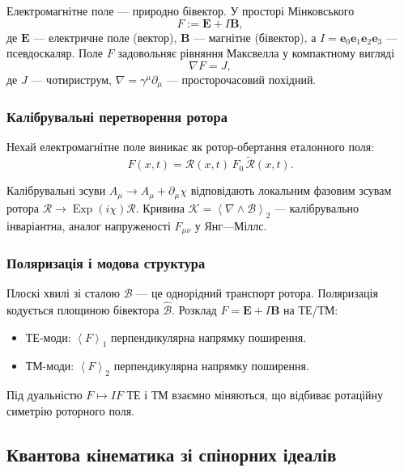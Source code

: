 \documentclass[11pt,a4paper]{article}
\newcommand{\e}{\mathbf{e}}
\newcommand{\grade}[2]{\left\langle #1 \right\rangle_{#2}}
\newcommand{\vecp}[1]{\grade{#1}{1}}
\newcommand{\biv}[1]{\grade{#1}{2}}
\newcommand{\rev}[1]{\widetilde{#1}}           %
\newcommand{\Exp}{\operatorname{Exp}}
\newcommand{\Rotor}{\mathcal{R}}
\newcommand{\Biv}{\mathcal{B}}
\newcommand{\D}{\nabla}                        %
\theoremstyle{definition}
\theoremstyle{plain}
\theoremstyle{remark}
\begin{document}
Електромагнітне поле — природно бівектор. У просторі Мінковського
\begin{equation}
F := \mathbf{E} + I\mathbf{B},
\end{equation}
де $\mathbf{E}$ — електричне поле (вектор), $\mathbf{B}$ — магнітне (бівектор), а $I = \e_0\e_1\e_2\e_3$ — псевдоскаляр. Поле $F$ задовольняє рівняння Максвелла у компактному вигляді
\begin{equation}
\D F = J,
\end{equation}
де $J$ — чотириструм, $\D = \gamma^\mu \partial_\mu$ — просторочасовий похідний.

\subsubsection{Калібрувальні перетворення ротора}

Нехай електромагнітне поле виникає як ротор-обертання еталонного поля:
\begin{equation}
F(x,t) = \Rotor(x,t)\, F_0\, \rev{\Rotor}(x,t).
\end{equation}

Калібрувальні зсуви $A_\mu \to A_\mu + \partial_\mu \chi$ відповідають локальним фазовим зсувам ротора $\Rotor \to \Exp(i\chi)\Rotor$. Кривина $\mathcal{K} = \biv{\D \wedge \Biv}$ — калібрувально інваріантна, аналог напруженості $F_{\mu\nu}$ у Янг—Міллс.

\subsubsection{Поляризація і модова структура}

Плоскі хвилі зі сталою $\Biv$ — це однорідний транспорт ротора. Поляризація кодується площиною бівектора $\hat{\Biv}$. Розклад $F = \mathbf{E} + I\mathbf{B}$ на ТЕ/ТМ:
\begin{itemize}
  \item ТЕ-моди: $\vecp{F}$ перпендикулярна напрямку поширення.
  \item ТМ-моди: $\biv{F}$ перпендикулярна напрямку поширення.
\end{itemize}

Під дуальністю $F \mapsto IF$ ТЕ і ТМ взаємно міняються, що відбиває ротаційну симетрію роторного поля.

\subsection{Квантова кінематика зі спінорних ідеалів}
\end{document}
